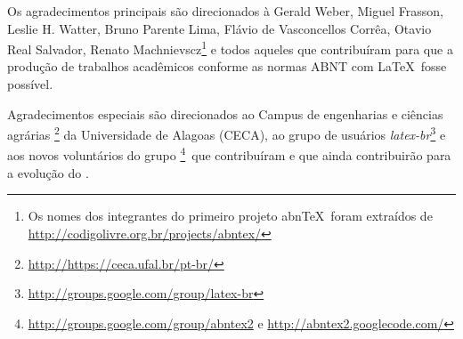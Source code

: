 \begin{agradecimentos}
	Os agradecimentos principais são direcionados à Gerald Weber, Miguel Frasson, Leslie H. Watter, Bruno Parente Lima, Flávio de Vasconcellos Corrêa, Otavio Real Salvador, Renato Machnievscz\footnote{Os nomes dos integrantes do primeiro projeto abn\TeX\ foram extraídos de \url{http://codigolivre.org.br/projects/abntex/}} e todos aqueles que contribuíram para que a produção de trabalhos acadêmicos conforme as normas ABNT com \LaTeX\ fosse possível.

	Agradecimentos especiais são direcionados ao Campus de engenharias e ciências agrárias \footnote{\url{http://https://ceca.ufal.br/pt-br/}} da Universidade de Alagoas (CECA), ao grupo de usuários \emph{latex-br}\footnote{\url{http://groups.google.com/group/latex-br}} e aos novos voluntários do grupo \emph{\abnTeX}\footnote{\url{http://groups.google.com/group/abntex2} e \url{http://abntex2.googlecode.com/}}~que contribuíram e que ainda contribuirão para a evolução do \abnTeX.
\end{agradecimentos}
